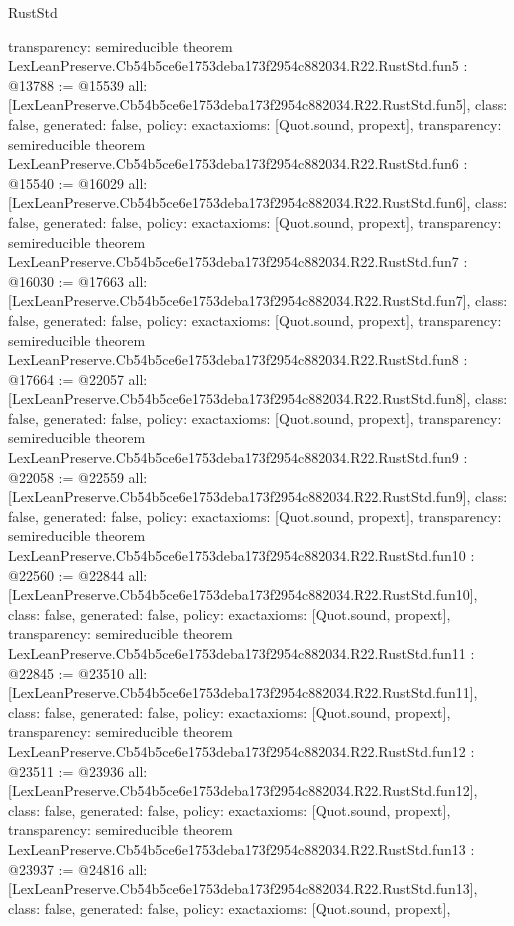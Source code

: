 \begin{lexlean}{RustStd}
\begin{coremodule}
{  transparency: semireducible
}
theorem LexLeanPreserve.Cb54b5ce6e1753deba173f2954c882034.R22.RustStd.fun5 : @13788 := @15539 {
  all: [LexLeanPreserve.Cb54b5ce6e1753deba173f2954c882034.R22.RustStd.fun5],
  class: false,
  generated: false,
  policy: exact{axioms: [Quot.sound, propext]},
  transparency: semireducible
}
theorem LexLeanPreserve.Cb54b5ce6e1753deba173f2954c882034.R22.RustStd.fun6 : @15540 := @16029 {
  all: [LexLeanPreserve.Cb54b5ce6e1753deba173f2954c882034.R22.RustStd.fun6],
  class: false,
  generated: false,
  policy: exact{axioms: [Quot.sound, propext]},
  transparency: semireducible
}
theorem LexLeanPreserve.Cb54b5ce6e1753deba173f2954c882034.R22.RustStd.fun7 : @16030 := @17663 {
  all: [LexLeanPreserve.Cb54b5ce6e1753deba173f2954c882034.R22.RustStd.fun7],
  class: false,
  generated: false,
  policy: exact{axioms: [Quot.sound, propext]},
  transparency: semireducible
}
theorem LexLeanPreserve.Cb54b5ce6e1753deba173f2954c882034.R22.RustStd.fun8 : @17664 := @22057 {
  all: [LexLeanPreserve.Cb54b5ce6e1753deba173f2954c882034.R22.RustStd.fun8],
  class: false,
  generated: false,
  policy: exact{axioms: [Quot.sound, propext]},
  transparency: semireducible
}
theorem LexLeanPreserve.Cb54b5ce6e1753deba173f2954c882034.R22.RustStd.fun9 : @22058 := @22559 {
  all: [LexLeanPreserve.Cb54b5ce6e1753deba173f2954c882034.R22.RustStd.fun9],
  class: false,
  generated: false,
  policy: exact{axioms: [Quot.sound, propext]},
  transparency: semireducible
}
theorem LexLeanPreserve.Cb54b5ce6e1753deba173f2954c882034.R22.RustStd.fun10 : @22560 := @22844 {
  all: [LexLeanPreserve.Cb54b5ce6e1753deba173f2954c882034.R22.RustStd.fun10],
  class: false,
  generated: false,
  policy: exact{axioms: [Quot.sound, propext]},
  transparency: semireducible
}
theorem LexLeanPreserve.Cb54b5ce6e1753deba173f2954c882034.R22.RustStd.fun11 : @22845 := @23510 {
  all: [LexLeanPreserve.Cb54b5ce6e1753deba173f2954c882034.R22.RustStd.fun11],
  class: false,
  generated: false,
  policy: exact{axioms: [Quot.sound, propext]},
  transparency: semireducible
}
theorem LexLeanPreserve.Cb54b5ce6e1753deba173f2954c882034.R22.RustStd.fun12 : @23511 := @23936 {
  all: [LexLeanPreserve.Cb54b5ce6e1753deba173f2954c882034.R22.RustStd.fun12],
  class: false,
  generated: false,
  policy: exact{axioms: [Quot.sound, propext]},
  transparency: semireducible
}
theorem LexLeanPreserve.Cb54b5ce6e1753deba173f2954c882034.R22.RustStd.fun13 : @23937 := @24816 {
  all: [LexLeanPreserve.Cb54b5ce6e1753deba173f2954c882034.R22.RustStd.fun13],
  class: false,
  generated: false,
  policy: exact{axioms: [Quot.sound, propext]},
}
\end{coremodule}
\end{lexlean}
